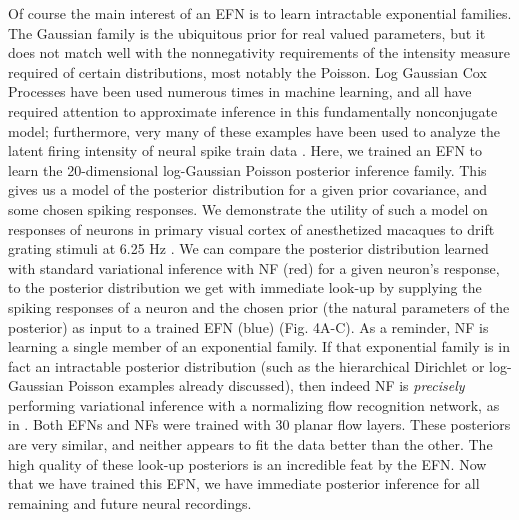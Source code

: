 \documentclass[twoside]{article}
\begin{document}
Of course the main interest of an EFN is to learn intractable exponential families.  The Gaussian family is the ubiquitous prior for real valued parameters, but it does not match well with the nonnegativity requirements of the intensity measure required of certain distributions, most notably the Poisson.  Log Gaussian Cox Processes have been used numerous times in machine learning, and all have required attention to approximate inference in this fundamentally nonconjugate model; furthermore, very many of these examples have been used to analyze the latent firing intensity of neural spike train data \citep{cunningham2008fast,cunningham2008inferring,adams2009tractable,gao2016linear}.
Here, we trained an EFN to learn the 20-dimensional log-Gaussian Poisson posterior inference family.  This gives us a model of the posterior distribution for a given prior covariance, and some chosen spiking responses.  We demonstrate the utility of such a model on responses of neurons in primary visual cortex of anesthetized macaques to drift grating stimuli at 6.25 Hz \citep{smith2008spatial}.  We can compare the posterior distribution learned with standard variational inference with NF (red) for a given neuron’s response, to the posterior distribution we get with immediate look-up by supplying the spiking responses of a neuron and the chosen prior (the natural parameters of the posterior) as input to a trained EFN (blue) (Fig. 4A-C).  As a reminder, NF is learning a single member of an exponential family.  If that exponential family is in fact an intractable posterior distribution (such as the hierarchical Dirichlet or log-Gaussian Poisson examples already discussed), then indeed NF is \emph{precisely} performing variational inference with a normalizing flow recognition network, as in \citep{rezende2015variational, dinh2016density, papamakarios2017masked}.  Both EFNs and NFs were trained with 30 planar flow layers.  These posteriors are very similar, and neither appears to fit the data better than the other.  The high quality of these look-up posteriors is an incredible feat by the EFN.  Now that we have trained this EFN, we have immediate posterior inference for all remaining and future neural recordings.
\end{document}
